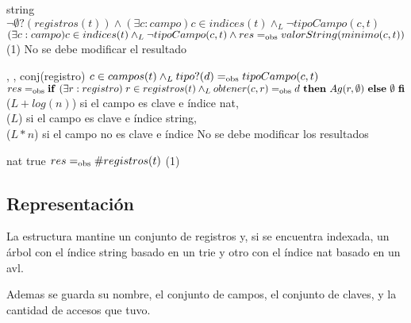 {   }
{string}
{$\neg\emptyset?(registros(t)) \land
    (\exists c : campo) c \in indices(t) \land_L \neg tipoCampo(c,t)$}
{$(\exists c : campo) c \in indices(t) \land_L \neg tipoCampo(c,t) \land
    res =_{\mathrm{obs}} valorString(minimo(c,t))$}
{\bigo(1)}
{No se debe modificar el resultado}
{}

{   ,
    ,
    }
{conj(registro)}
{$c \in campos(t) \land_L tipo?(d) =_{\mathrm{obs}} tipoCampo(c,t)$}
{$res \igobs \IFLM (\exists r : registro) \; r \in registros(t) \land_L obtener(c,r) \igobs d
    THEN Ag(r,\emptyset) ELSE \emptyset FI$}
{\bigo($L + log(n)$) si el campo es clave e índice nat, \\
    \hspace*{4em} \bigo($L$) si el campo es clave e índice string, \\
    \hspace*{4em} \bigo($L * n$) si el campo no es clave e índice}
{No se debe modificar los resultados}
{}

{   }
{nat}
{true}
{$res =_{\mathrm{obs}} \#registros(t)$}
{\bigo(1)}
{}
{}

\subsection{Representación}

La estructura mantine un conjunto de registros y, si se encuentra indexada, un árbol con el índice string basado en un trie y otro con el índice nat basado en un avl.

Ademas se guarda su nombre, el conjunto de campos, el conjunto de claves, y la cantidad de accesos que tuvo.

\vspace*{2em}




